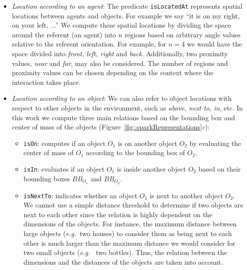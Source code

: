 \documentclass{svmult}
\newcommand{\concept}[1]{{\footnotesize \texttt{#1}}}
\newcommand{\eg}{{\textit{e.g.~}}}
\begin{document}
\begin{itemize} 

\item \emph{Location according to an agent}: The predicate
\concept{isLocatedAt} represents spatial locations between agents and objects.
For example we say ``it is on my right, on your left, ...'' We compute these
spatial locations by dividing the space around the referent (an agent) into $n$
regions based on arbitrary angle values relative to the referent orientation.
For example, for $n = 4$ we would have the space divided into \emph{front,
left, right} and \emph{back}. Additionally, two proximity values, \emph{near}
and \emph{far}, may also be considered. The number of regions and proximity
values can be chosen depending on the context where the interaction takes
place.

\item \emph{Location according to an object}: We can also refer to object
locations with respect to other objects in the environment, such as \emph{above,
next to, in}, etc. In this work we compute three main relations based on the
bounding box and center of mass of the objects 
(Figure~\ref{fig::sparkRepresentations}\emph{c}): 

\begin{itemize}
	\item \concept{isOn}: computes if an object $O_1$ is on another object $O_2$ by
	evaluating the center of mass of $O_1$ according to the bounding box of $O_2$.

	\item \concept{isIn}: evaluates if an object $O_1$ is inside another object
	$O_2$ based on their bounding boxes $BB_{O_1}$ and $BB_{O_2}$.

	\item \concept{isNextTo}: indicates whether an object $O_1$ is next to another
	object $O_2$. We cannot use a simple distance threshold to determine if two
	objects are next to each other since the relation is highly dependent on the
	dimensions of the objects. For instance, the maximum distance between large
	objects (\eg two houses) to consider them as being next to each other is much
	larger than the maximum distance we would consider for two small objects (\eg
	two bottles). Thus, the relation between the dimensions and the distances of
	the objects are taken into account.  


\end{itemize} 
\end{itemize}
\end{document}

